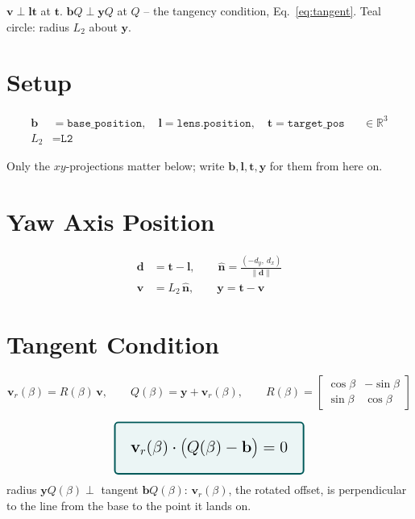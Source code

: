 \documentclass[11pt,a4paper]{article}
\begin{document}
\noindent
$\mathbf v \perp \mathbf l\mathbf t$ at $\mathbf t$. $\mathbf b Q \perp \mathbf y Q$ at $Q$ --
the tangency condition, Eq.~\eqref{eq:tangent}. Teal circle: radius $L_2$ about $\mathbf y$.

\section{Setup}

\begin{align*}
\mathbf b &= \texttt{base\_position}, \quad
\mathbf l = \texttt{lens.position}, \quad
\mathbf t = \texttt{target\_pos} &&\in \mathbb R^3\\
L_2 &= \texttt{L2}
\end{align*}

Only the $xy$-projections matter below; write $\mathbf b,\mathbf l,\mathbf t,\mathbf y$ for them
from here on.

\section{Yaw Axis Position}

\begin{align}
\mathbf d &= \mathbf t - \mathbf l, \qquad
\hat{\mathbf n} = \frac{(-d_y,\ d_x)}{\lVert \mathbf d \rVert} \\
\mathbf v &= L_2\, \hat{\mathbf n}, \qquad
\mathbf y = \mathbf t - \mathbf v
\end{align}

\section{Tangent Condition}

\begin{equation}
\mathbf v_r(\beta) = R(\beta)\,\mathbf v, \qquad
Q(\beta) = \mathbf y + \mathbf v_r(\beta), \qquad
R(\beta) = \begin{bmatrix}\cos\beta & -\sin\beta \\ \sin\beta & \cos\beta\end{bmatrix}
\end{equation}

\begin{equation}
\label{eq:tangent}
\raisebox{-0.5\height}{\tikz \node[draw=teal!70!black, line width=1.4pt, rounded corners=3pt,
fill=teal!8, inner sep=14pt]
{\Large $\displaystyle \mathbf v_r(\beta)\cdot\big(Q(\beta) - \mathbf b\big) = 0$};}
\end{equation}
radius $\mathbf y Q(\beta) \perp$ tangent $\mathbf b Q(\beta)$: $\mathbf v_r(\beta)$, the rotated
offset, is perpendicular to the line from the base to the point it lands on.
\end{document}
